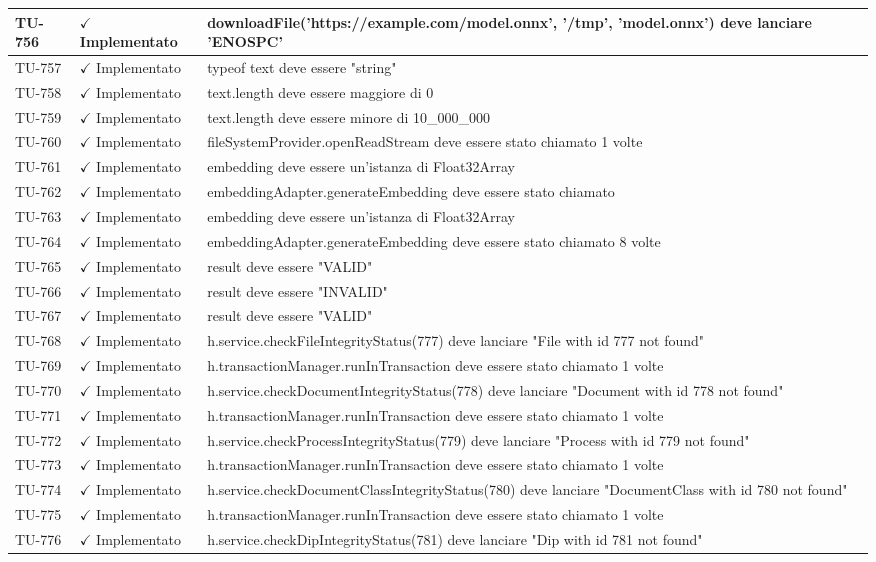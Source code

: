 ﻿\documentclass[a4paper,12pt]{article}
\newcommand{\ok}{\textcolor{green!60!black}{$\checkmark$ Implementato}}
\begin{document}
\begin{longtable}{|p{2cm}|p{3.5cm}|p{9.5cm}|}
\hline
TU-756 & \ok & downloadFile('https://example.com/model.onnx', '/tmp', 'model.onnx') deve lanciare 'ENOSPC' \\
\hline
TU-757 & \ok & typeof text deve essere "string" \\
\hline
TU-758 & \ok & text.length deve essere maggiore di 0 \\
\hline
TU-759 & \ok & text.length deve essere minore di 10\_000\_000 \\
\hline
TU-760 & \ok & fileSystemProvider.openReadStream deve essere stato chiamato 1 volte \\
\hline
TU-761 & \ok & embedding deve essere un'istanza di Float32Array \\
\hline
TU-762 & \ok & embeddingAdapter.generateEmbedding deve essere stato chiamato \\
\hline
TU-763 & \ok & embedding deve essere un'istanza di Float32Array \\
\hline
TU-764 & \ok & embeddingAdapter.generateEmbedding deve essere stato chiamato 8 volte \\
\hline
TU-765 & \ok & result deve essere "VALID" \\
\hline
TU-766 & \ok & result deve essere "INVALID" \\
\hline
TU-767 & \ok & result deve essere "VALID" \\
\hline
TU-768 & \ok & h.service.checkFileIntegrityStatus(777) deve lanciare "File with id 777 not found" \\
\hline
TU-769 & \ok & h.transactionManager.runInTransaction deve essere stato chiamato 1 volte \\
\hline
TU-770 & \ok & h.service.checkDocumentIntegrityStatus(778) deve lanciare "Document with id 778 not found" \\
\hline
TU-771 & \ok & h.transactionManager.runInTransaction deve essere stato chiamato 1 volte \\
\hline
TU-772 & \ok & h.service.checkProcessIntegrityStatus(779) deve lanciare "Process with id 779 not found" \\
\hline
TU-773 & \ok & h.transactionManager.runInTransaction deve essere stato chiamato 1 volte \\
\hline
TU-774 & \ok & h.service.checkDocumentClassIntegrityStatus(780) deve lanciare "DocumentClass with id 780 not found" \\
\hline
TU-775 & \ok & h.transactionManager.runInTransaction deve essere stato chiamato 1 volte \\
\hline
TU-776 & \ok & h.service.checkDipIntegrityStatus(781) deve lanciare "Dip with id 781 not found" \\

\end{longtable}
\end{document}
